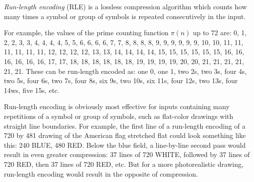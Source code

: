\documentclass[12pt]{article}
\begin{document}
{\em Run-length encoding} (RLE) is a lossless compression algorithm which counts how many times a symbol or group of symbols is repeated consecutively in the input.

For example, the values of the prime counting function $\pi(n)$ up to 72 are: 0, 1, 2, 2, 3, 3, 4, 4, 4, 4, 5, 5, 6, 6, 6, 6, 7, 7, 8, 8, 8, 8, 9, 9, 9, 9, 9, 9, 10, 10, 11, 11, 11, 11, 11, 11, 12, 12, 12, 12, 13, 13, 14, 14, 14, 14, 15, 15, 15, 15, 15, 15, 16, 16, 16, 16, 16, 16, 17, 17, 18, 18, 18, 18, 18, 18, 19, 19, 19, 19, 20, 20, 21, 21, 21, 21, 21, 21. These can be run-length encoded as: one 0, one 1, two 2s, two 3s, four 4s, two 5s, four 6s, two 7s, four 8s, six 9s, two 10s, six 11s, four 12s, two 13s, four 14ws, five 15s, etc.

Run-length encoding is obviously most effective for inputs containing many repetitions of a symbol or group of symbols, such as flat-color drawings with straight line boundaries. For example, the first line of a run-length encoding of a 720 by 481 drawing of the American flag stretched flat could look something like this: 240 BLUE, 480 RED. Below the blue field, a line-by-line second pass would result in even greater compression: 37 lines of 720 WHITE, followed by 37 lines of 720 RED, then 37 lines of 720 RED, etc. But for a more photorealistic drawing, run-length encoding would result in the opposite of compression.
\end{document}
